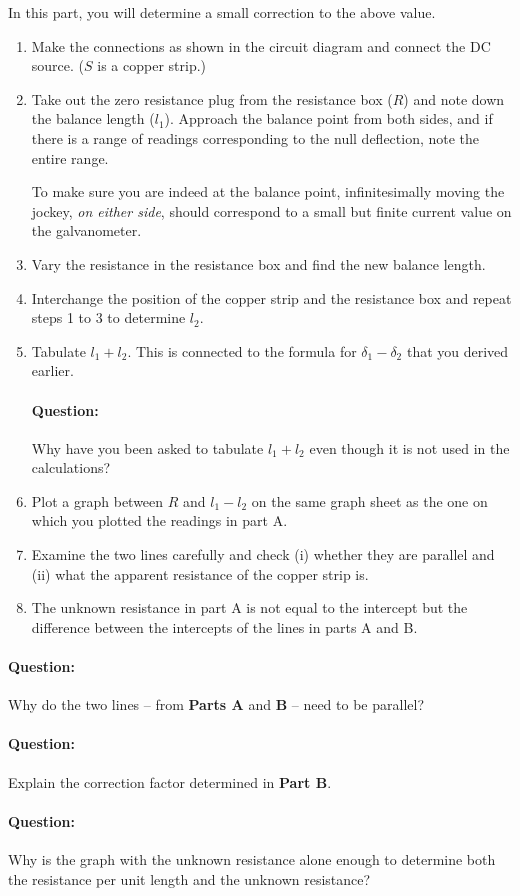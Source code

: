 In this part, you will determine a small correction to the above value. 
\begin{enumerate}
    \item Make the connections as shown in the circuit diagram and connect the DC source. ($S$ is a copper strip.)
    \item Take out the zero resistance plug from the resistance box ($R$) and note down the balance length ($l_1$). Approach the balance point from both sides, and if there is a range of readings corresponding to the null deflection, note the entire range. 
    \begin{tip}
        To make sure you are indeed at the balance point, infinitesimally moving the jockey, \textit{on either side}, should correspond to a small but finite current value on the galvanometer.
    \end{tip}
    \item Vary the resistance in the resistance box and find the new balance length.
    \item Interchange the position of the copper strip and the resistance box and repeat steps 1 to 3 to determine $l_2$.
    \item Tabulate $l_1 + l_2$. This is connected to the formula for $\delta_1 - \delta_2$ that you derived earlier.
    \begin{question}
    \paragraph{Question:} Why have you been asked to tabulate $l_1 + l_2$ even though it is not used in the calculations?
    \end{question}
    \item Plot a graph between $R$ and $l_1 -l_2$ on the same graph sheet as the one on which you plotted the readings in part A. 
    \item Examine the two lines carefully and check (i) whether they are parallel and (ii) what the apparent resistance of the copper strip is. 
    \item The unknown resistance in part A is not equal to the intercept but the difference between the intercepts of the lines in parts A and B. 
    
\end{enumerate}

\begin{question}
\paragraph{Question:} Why do the two lines -- from \textbf{Parts A} and \textbf{B} -- need to be parallel?
\paragraph{Question:} Explain the correction factor determined in \textbf{Part B}. 
\paragraph{Question:} Why is the graph with the unknown resistance alone enough to determine both the resistance per unit length and the unknown resistance?
\end{question}

